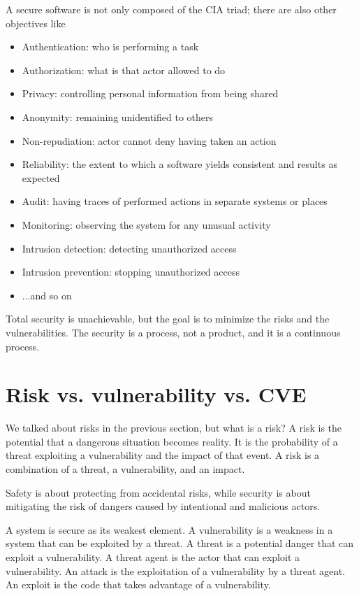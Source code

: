 A secure software is not only composed of the CIA triad; there are also other objectives like~\cite{st-slides}
\begin{itemize}
  \item Authentication: who is performing a task
  \item Authorization: what is that actor allowed to do
  \item Privacy: controlling personal information from being shared
  \item Anonymity: remaining unidentified to others
  \item Non-repudiation: actor cannot deny having taken an action
  \item Reliability: the extent to which a software yields consistent and results as expected
  \item Audit: having traces of performed actions in separate systems or places
  \item Monitoring: observing the system for any unusual activity
  \item Intrusion detection: detecting unauthorized access
  \item Intrusion prevention: stopping unauthorized access
  \item ...and so on
\end{itemize}

Total security is unachievable, but the goal is to minimize the risks and the vulnerabilities. The security is a process, not a product, and it is a continuous process.~\cite{st-slides}

\section{Risk vs. vulnerability vs. CVE}

We talked about risks in the previous section, but what is a risk? A risk is the potential that a dangerous situation becomes reality. It is the probability of a threat exploiting a vulnerability and the impact of that event. A risk is a combination of a threat, a vulnerability, and an impact.

Safety is about protecting from accidental risks, while security is about mitigating the risk of dangers caused by intentional and malicious actors.

A system is secure as its weakest element. A vulnerability is a weakness in a system that can be exploited by a threat. A threat is a potential danger that can exploit a vulnerability. A threat agent is the actor that can exploit a vulnerability. An attack is the exploitation of a vulnerability by a threat agent. An exploit is the code that takes advantage of a vulnerability.

